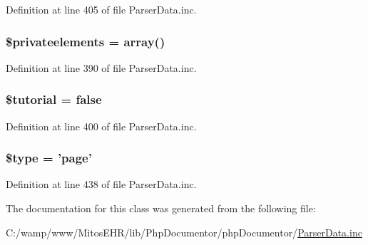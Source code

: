 \-Definition at line 405 of file \-Parser\-Data.\-inc.

\hypertarget{classparser_data_acefdabe0fd6610bce2e0863823e3a799}{
\subsubsection[{\$privateelements}]{\setlength{\rightskip}{0pt plus 5cm}\$privateelements = array()}}\label{classparser_data_acefdabe0fd6610bce2e0863823e3a799}


\-Definition at line 390 of file \-Parser\-Data.\-inc.

\hypertarget{classparser_data_a78498c66c97cfd4c420a7f2908b65f24}{
\subsubsection[{\$tutorial}]{\setlength{\rightskip}{0pt plus 5cm}\$tutorial = false}}\label{classparser_data_a78498c66c97cfd4c420a7f2908b65f24}


\-Definition at line 400 of file \-Parser\-Data.\-inc.

\hypertarget{classparser_data_a9a4a6fba2208984cabb3afacadf33919}{
\subsubsection[{\$type}]{\setlength{\rightskip}{0pt plus 5cm}\$type = 'page'}}\label{classparser_data_a9a4a6fba2208984cabb3afacadf33919}


\-Definition at line 438 of file \-Parser\-Data.\-inc.



\-The documentation for this class was generated from the following file\-:\begin{DoxyCompactItemize}
\item 
\-C\-:/wamp/www/\-Mitos\-E\-H\-R/lib/\-Php\-Documentor/php\-Documentor/\hyperlink{_parser_data_8inc}{\-Parser\-Data.\-inc}\end{DoxyCompactItemize}
